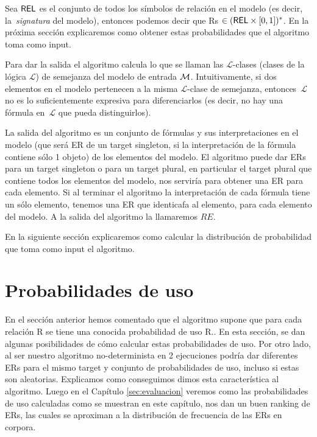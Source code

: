 Sea $\textsf{REL}$ es el
conjunto de todos los s\'imbolos de relaci\'on en el modelo (es decir, la~\emph{signatura} del modelo), entonces podemos decir que Rs $\in (\textsf{REL} \times [0,1])^*$. En la pr\'oxima secci\'on explicaremos como obtener estas probabilidades que el algoritmo toma como input.

Para dar la salida el algoritmo calcula lo que se llaman las $\mathcal {L}$-clases (clases de la l\'ogica $\mathcal {L}$) de semejanza del modelo de entrada $\mathcal{M} $. Intuitivamente, si dos elementos en el modelo pertenecen a la misma $\mathcal {L}$-clase de semejanza, entonces~$\mathcal {L}$ no es lo suficientemente expresiva para diferenciarlos (es decir, no hay una f\'ormula en~$\mathcal {L }$ que pueda distinguirlos).

La salida del algoritmo es un conjunto de f\'ormulas y sus interpretaciones en el modelo (que ser\'a ER de un target singleton, si la interpretaci\'on de la f\'ormula contiene s\'olo 1 objeto) de los elementos del modelo. El algoritmo puede dar ERs para un target singleton o para un target plural, en particular el target plural que contiene todos los elementos del modelo, nos servir\'ia para obtener una ER para cada elemento. Si al terminar el algoritmo la interpretaci\'on de cada f\'ormula tiene un s\'olo elemento, tenemos una ER que identicafa al elemento, para cada elemento del modelo. A la salida del algoritmo la llamaremos $RE$.

En la siguiente secci\'on explicaremos como calcular la distribuci\'on de probabilidad que toma como input el algoritmo. 

\section{Probabilidades de uso}
\label{sec:learning}

En el secci\'on anterior hemos comentado que el algoritmo supone que para cada relaci\'on R se tiene una conocida probabilidad de uso R.\puse. En esta secci\'on, se dan algunas posibilidades de c\'omo calcular estas probabilidades de uso. Por otro lado, al ser nuestro algoritmo no-determinista en 2 ejecuciones podr\'ia dar diferentes ERs para el mismo target y conjunto de probabilidades de uso, incluso si estas son aleatorias. Explicamos como conseguimos dimos esta caracter\'istica al algoritmo. Luego en el Cap\'itulo \ref{sec:evaluacion} veremos como las probabilidades de uso calculadas como se muestran en este cap\'itulo, nos dan un buen ranking de ERs, las cuales se aproximan a la distribuci\'on de frecuencia de las ERs en corpora.

